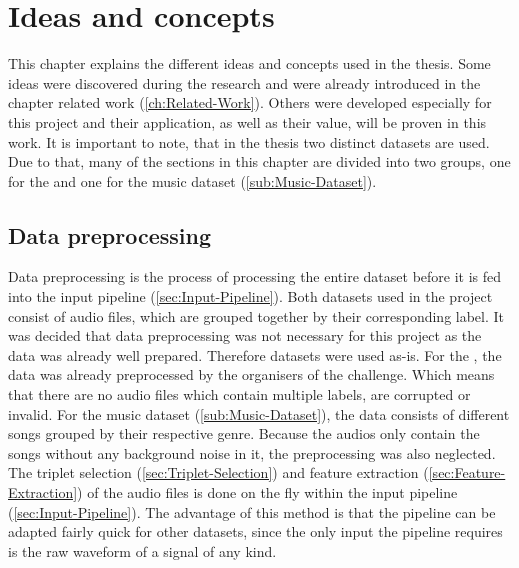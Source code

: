 \chapter{Ideas and concepts}
\label{ch:Ideas-Concepts}
This chapter explains the different ideas and concepts used in the thesis. Some ideas were discovered during the research and were already introduced in the chapter related work (\ref{ch:Related-Work}). Others were developed especially for this project and their application, as well as their value, will be proven in this work.
\newline
\newline
It is important to note, that in the thesis two distinct datasets are used. Due to that, many of the sections in this chapter are divided into two groups, one for the  and one for the music dataset (\ref{sub:Music-Dataset}).

\section{Data preprocessing}
\label{sec:Data-Preprocessing}
Data preprocessing is the process of processing the entire dataset before it is fed into the input pipeline (\ref{sec:Input-Pipeline}). Both datasets used in the project consist of audio files, which are grouped together by their corresponding label. It was decided that data preprocessing was not necessary for this project as the data was already well prepared. Therefore datasets were used as-is.
\newline
\newline
For the , the data was already preprocessed by the organisers of the challenge. Which means that there are no audio files which contain multiple labels, are corrupted or invalid.
\newline
\newline
For the music dataset (\ref{sub:Music-Dataset}), the data consists of different songs grouped by their respective genre. Because the audios only contain the songs without any background noise in it, the preprocessing was also neglected. 
\newline
\newline
The triplet selection (\ref{sec:Triplet-Selection}) and feature extraction (\ref{sec:Feature-Extraction}) of the audio files is done on the fly within the input pipeline (\ref{sec:Input-Pipeline}). The advantage of this method is that the pipeline can be adapted fairly quick for other datasets, since the only input the pipeline requires is the raw waveform of a signal of any kind. 

